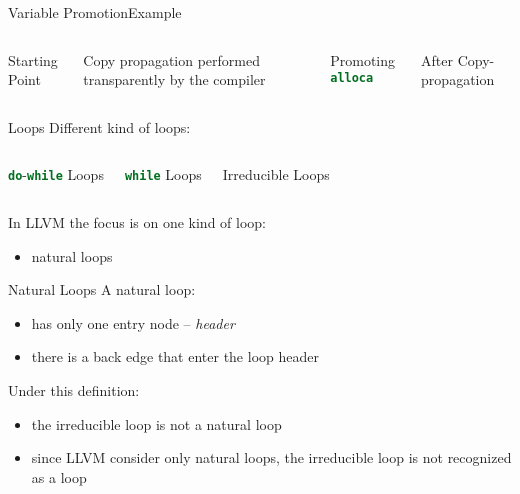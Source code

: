 \documentclass[10pt,mathserif]{beamer}
\newcommand{\cinline}[1]{\lstinline[language=C]!#1!}
\newcommand{\llvminput}[1]{}
\newcommand{\llvminline}[1]{\lstinline[language=LLVM]!#1!}
\begin{document}
\begin{frame}{Variable Promotion}{Example}
\begin{columns}[t]
\begin{block}{Starting Point}
\centering
\llvminput{snippet/02/saxpy.ll}
\end{block}

Copy propagation performed transparently by the compiler

\begin{block}{Promoting \llvminline{alloca}}
\centering
\llvminput{snippet/02/mem2reg-saxpy.ll}
\end{block}

\begin{block}{After Copy-propagation}
\centering
\llvminput{snippet/02/mem2reg-copy-saxpy.ll}
\end{block}

\end{columns}
\end{frame}

\begin{frame}{Loops}
Different kind of loops:

\begin{columns}[t]
\begin{block}{\cinline{do}-\cinline{while} Loops}
\centering

\end{block}

\begin{block}{\cinline{while} Loops}
\centering

\end{block}

\begin{block}{Irreducible Loops}
\centering

\end{block}
\end{columns}

\bigskip
In LLVM the focus is on one kind of loop:

\begin{itemize}
\item natural loops
\end{itemize}
\end{frame}

\begin{frame}{Natural Loops}
A natural loop:

\begin{itemize}
\item has only one entry node -- \emph{header}
\item there is a back edge that enter the loop header
\end{itemize}

Under this definition:

\begin{itemize}
\item the irreducible loop is not a natural loop
\item since LLVM consider only natural loops, the irreducible loop \alert{is not
      recognized} as a loop
\end{itemize}
\end{frame}
\end{document}
